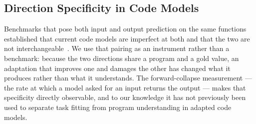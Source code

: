 \subsection{Direction Specificity in Code Models}
Benchmarks that pose both input and output prediction on the same functions established that current
code models are imperfect at both and that the two are not interchangeable~\cite{cruxeval}. We use
that pairing as an instrument rather than a benchmark: because the two directions share a program and
a gold value, an adaptation that improves one and damages the other has changed what it produces
rather than what it understands. The forward-collapse measurement --- the rate at which a model asked
for an input returns the output --- makes that specificity directly observable, and to our knowledge
it has not previously been used to separate task fitting from program understanding in adapted code
models.
